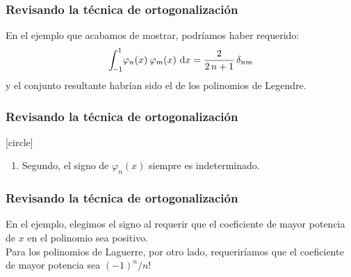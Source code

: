 \documentclass[12pt]{beamer}
\begin{document}
\begin{frame}
\frametitle{Revisando la técnica de ortogonalización}
En el ejemplo que acabamos de mostrar, podríamos haber requerido:
\pause
\begin{align}
\scaleint{5ex}_{\bs -1}^{1} \varphi_{n} (x) \: \varphi_{m} (x) \, \dd{x} = \dfrac{2}{2 \, n +1} \, \delta_{nm}
\label{eq:ecuacion_10_61}
\end{align}
y el conjunto resultante habrían sido el de los polinomios de Legendre.
\end{frame}
\begin{frame}
\frametitle{Revisando la técnica de ortogonalización}
[circle]
\begin{enumerate}[<+->]  
\conti
\item Segundo, el signo de $\varphi_{n} (x)$ siempre es indeterminado.
\end{enumerate}
\end{frame}
\begin{frame}
\frametitle{Revisando la técnica de ortogonalización}
En el ejemplo, elegimos el signo al requerir que el coeficiente de mayor potencia de $x$ en el polinomio sea positivo. 
\\
\bigskip
\pause
Para los polinomios de Laguerre, por otro lado, requeriríamos que el coeficiente de mayor potencia sea $(-1)^{n}/n!$
\end{frame}
\end{document}
